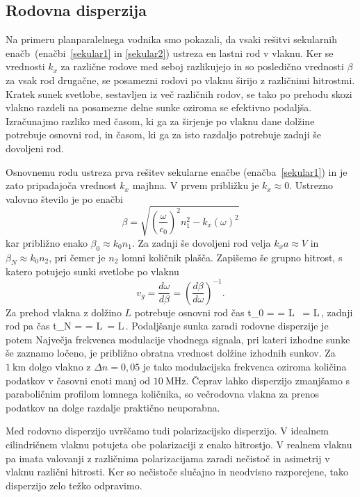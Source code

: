 \subsection*{Rodovna disperzija}
Na primeru planparalelnega vodnika smo pokazali, da vsaki rešitvi sekularnih 
enačb~(enačbi~\ref{sekular1} in \ref{sekular2}) ustreza en lastni rod v vlaknu.
Ker se vrednosti $k_x$ za različne rodove med seboj razlikujejo in so posledično vrednosti $\beta$ za 
vsak rod drugačne, se posamezni rodovi po vlaknu širijo z različnimi hitrostmi. Kratek
sunek svetlobe, sestavljen iz več različnih rodov, se tako po prehodu skozi vlakno
razdeli na posamezne delne sunke oziroma se efektivno podaljša. 
Izračunajmo razliko med časom, ki ga za širjenje po vlaknu dane dolžine 
potrebuje osnovni rod, in časom, ki ga za isto razdaljo potrebuje zadnji še dovoljeni rod.
 
Osnovnemu rodu ustreza prva rešitev sekularne enačbe (enačba~\ref{sekular1}) in je zato pripadajoča 
vrednost $k_x$ majhna. V prvem približku je $k_x \approx 0$. Ustrezno valovno 
število je po enačbi
\begin{equation}
\beta = \sqrt{\left( \frac{\omega}{c_0}\right)^2n_1^2 - k_x(\omega)^2}
\label{nelinfib}
\end{equation}
kar približno enako $\beta_0 \approx k_0 n_1$. 
Za zadnji še dovoljeni rod velja $k_xa \approx V$ in $\beta_N \approx k_0 n_2$, pri čemer je
$n_2$ lomni količnik plašča. Zapišemo še grupno hitrost, s katero potujejo sunki 
svetlobe po vlaknu
\begin{equation}
v_{g}=\frac{d\omega}{d\beta}=\left(\frac{d\beta}{d\omega}\right)^{-1}\!.
\label{9.51}
\end{equation}
Za prehod vlakna z dolžino $L$ potrebuje osnovni rod čas
\beq
t_0 =  =  L \, = L\,,
\eeq
zadnji rod pa čas
\beq
t_N =  = L\,  = L\,.
\eeq
Podaljšanje sunka zaradi rodovne disperzije je potem 
Največja frekvenca modulacije vhodnega signala, pri kateri izhodne sunke še zaznamo ločeno,
je približno obratna vrednost dolžine izhodnih sunkov. Za $1~\si{\kilo\meter}$ dolgo vlakno z 
$\Delta n = 0,05$  je tako modulacijska frekvenca oziroma količina podatkov v časovni
enoti manj od $10~\si{\mega\hertz}$. Čeprav lahko disperzijo zmanjšamo 
s paraboličnim profilom lomnega količnika, so večrodovna vlakna za prenos podatkov na dolge 
razdalje praktično neuporabna.
\begin{remark}
 Med rodovno disperzijo uvrščamo tudi polarizacijsko disperzijo. 
 V idealnem cilindričnem vlaknu potujeta obe polarizaciji
 z enako hitrostjo. V realnem vlaknu pa imata valovanji z različnima polarizacijama zaradi
 nečistoč in asimetrij v vlaknu različni hitrosti. 
 Ker so nečistoče slučajno in neodvisno razporejene, tako disperzijo zelo težko odpravimo.
\end{remark}

